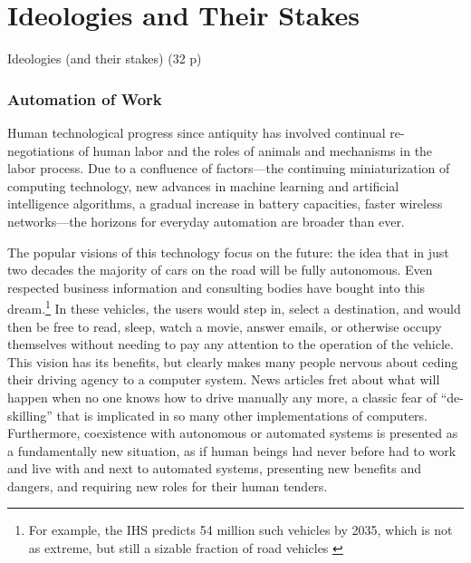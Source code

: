 \chapter{Ideologies and Their Stakes}

Ideologies (and their stakes) (32 p)

\subsection{Automation of Work}

Human technological progress since antiquity has
involved continual re-negotiations of human labor and the roles of
animals and mechanisms in the labor process. Due to a confluence
of factors---the continuing miniaturization of computing technology, new
advances in machine learning and artificial intelligence algorithms, a
gradual increase in battery capacities, faster wireless networks---the
horizons for everyday automation are broader than ever. 

The popular visions of this technology focus on the future: the
idea that in just two decades the majority of cars on the road will be
fully autonomous. Even respected business information and consulting
bodies have bought into this dream.\footnote{For example, the IHS
  predicts 54 million such vehicles by 2035, which is not as extreme,
  but still a sizable fraction of road vehicles \cite{IHSstudy}} In these vehicles, the users would
step in, select a destination, and would then be free to read, sleep,
watch a movie, answer emails, or otherwise occupy themselves without
needing to pay any attention to the operation of the vehicle. This
vision has its benefits, but clearly makes many people nervous about
ceding their driving agency to a computer system.\cite{clytton} News articles fret
about what will happen when no one knows how to drive manually any
more,\cite{pross} a classic fear of ``de-skilling'' that is implicated in so many
other implementations of computers. Furthermore, coexistence with
autonomous or automated systems is presented as a fundamentally new
situation, as if human beings had never before had to work and live
with and next to automated systems, presenting new benefits and
dangers, and requiring new roles for their human tenders.

